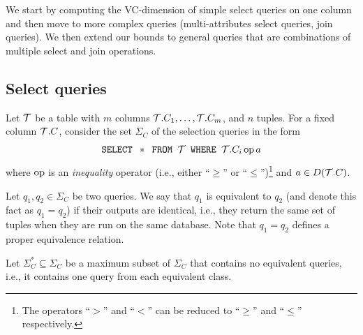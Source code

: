 We start by computing the VC-dimension of simple select queries on one
column and then move to more complex queries (multi-attributes select
queries, join queries). We then extend our bounds to general queries that are
combinations of multiple select and join operations.

\subsection{Select queries}\label{sec:vcfreqvcdimselqueries}
Let ${\cal T}$ be a table with $m$ columns ${\cal T}.C_1,\dotsc,{\cal T}.C_m$, and $n$
tuples. For a fixed column ${\cal T}.C$, consider the set $\Sigma_C$ of the
selection queries in the form 
\begin{equation}\label{eq:vcfreqselect}
\mbox{\texttt{SELECT }} *\mbox{\texttt{ FROM }} {\cal T} \mbox{\texttt{ WHERE }}
{\cal T}.C_i \operatorname{op} a \end{equation}
where $\operatorname{op}$ is an \emph{inequality} operator (i.e., either ``$\ge$'' or
``$\le$'')\footnote{The operators
``$>$'' and ``$<$'' can be reduced to ``$\ge$'' and ``$\le$'' respectively.} and
$a\in D({\cal T}.C)$. 

Let $q_1,q_2\in\Sigma_C$ be two queries. We say that $q_1$ is equivalent to
$q_2$ (and denote this fact as $q_1=q_2$) if their outputs are identical, i.e.,
they return the same set of tuples when they are run on the same database. Note
that $q_1=q_2$ defines a proper equivalence relation. 

Let $\Sigma^*_C \subseteq \Sigma_C$ be a maximum subset of $\Sigma_C$ that
contains no equivalent queries, i.e., it contains one query from each equivalent
class.
%
%


